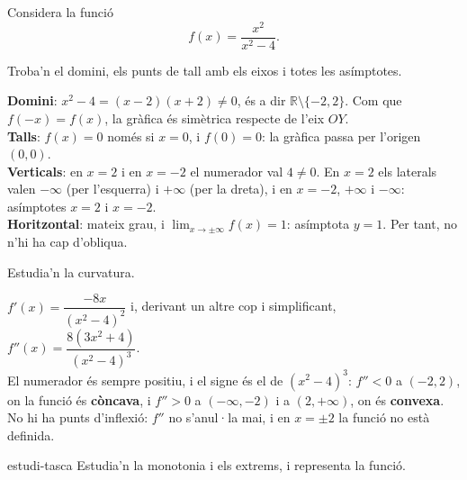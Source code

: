 Considera la funció
\[
f(x)=\frac{x^2}{x^2-4} .
\]

\begin{apartats}

Troba'n el domini, els punts de tall amb els eixos i totes les asímptotes.

\begin{solucio}
\textbf{Domini}: $x^2-4=(x-2)(x+2)\neq0$, és a dir $\mathbb{R}\setminus\{-2,2\}$. Com que
$f(-x)=f(x)$, la gràfica és simètrica respecte de l'eix $OY$.\\
\textbf{Talls}: $f(x)=0$ només si $x=0$, i $f(0)=0$: la gràfica passa per l'origen $(0,0)$.\\
\textbf{Verticals}: en $x=2$ i en $x=-2$ el numerador val $4\neq0$. En $x=2$ els laterals valen $-\infty$
(per l'esquerra) i $+\infty$ (per la dreta), i en $x=-2$, $+\infty$ i $-\infty$: asímptotes
$\boxed{x=2}$ i $\boxed{x=-2}$.\\
\textbf{Horitzontal}: mateix grau, i $\lim_{x\to\pm\infty}f(x)=1$: asímptota $\boxed{y=1}$. Per tant,
no n'hi ha cap d'obliqua.
\end{solucio}

\begin{nomesllarg}
Estudia'n la curvatura.

\begin{solucio}
$f'(x)=\dfrac{-8x}{\left(x^2-4\right)^2}$ i, derivant un altre cop i simplificant,
$f''(x)=\dfrac{8\left(3x^2+4\right)}{\left(x^2-4\right)^3}$.\\
El numerador és sempre positiu, i el signe és el de $\left(x^2-4\right)^3$: $f''<0$ a $(-2,2)$, on la
funció és \textbf{còncava}, i $f''>0$ a $(-\infty,-2)$ i a $(2,+\infty)$, on és \textbf{convexa}.\\
No hi ha punts d'inflexió: $f''$ no s'anul·la mai, i en $x=\pm2$ la funció no està definida.
\end{solucio}
\end{nomesllarg}

\begin{tria}{estudi-tasca}
Estudia'n la monotonia i els extrems, i representa la funció.


\end{tria}
\end{apartats}
